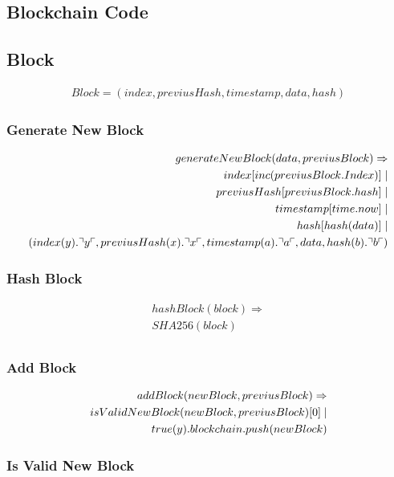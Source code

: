 \subsection{Blockchain Code}

\subsection{Block}
\begin{align*}
Block = (index, previusHash, timestamp, data, hash)
\end{align*}

\subsubsection{Generate New Block}

\begin{align*}
generateNewBlock(data, previusBlock)\Rightarrow \\
index[inc(previusBlock.Index)]\mid\\
previusHash[previusBlock.hash] \mid \\
timestamp[time.now] \mid \\
hash[hash(data)] \mid \\
(index(y).\urcorner y \ulcorner, previusHash(x).\urcorner x \ulcorner, timestamp(a).\urcorner a \ulcorner, data, hash(b).\urcorner b \ulcorner)
\end{align*}

\subsubsection{Hash Block}

\begin{align*}
hashBlock(block)\Rightarrow\\
SHA256(block)\\
\end{align*}

\subsubsection{Add Block}

\begin{align*}
addBlock(newBlock, previusBlock) \Rightarrow\\
isValidNewBlock(newBlock, previusBlock)[0]\mid \\
true(y).blockchain.push(newBlock)
\end{align*}

\subsubsection{Is Valid New Block}

